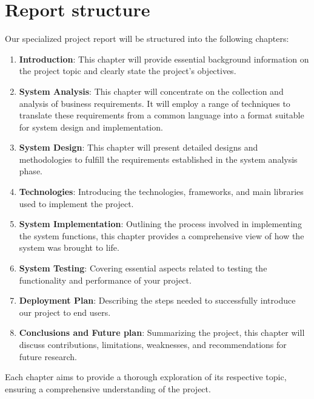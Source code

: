 \section{Report structure}
Our specialized project report will be structured into the following chapters:
\begin{enumerate}
    \item \textbf{Introduction}: This chapter will provide essential background information on the project topic and clearly state the project’s objectives.
    \item \textbf{System Analysis}:  This chapter will concentrate on the collection and analysis of business requirements. It will employ a range of techniques to translate these requirements from a common language into a format suitable for system design and implementation.
    \item \textbf{System Design}: This chapter will present detailed designs and methodologies to fulfill the requirements established in the system analysis phase.
    \item \textbf{Technologies}: Introducing the technologies, frameworks, and main libraries used to implement the project.
    \item \textbf{System Implementation}: Outlining the process involved in implementing the system functions, this chapter provides a comprehensive view of how the system was brought to life.
    \item \textbf{System Testing}:  Covering essential aspects related to testing the functionality and performance of your project.
    \item \textbf{Deployment Plan}: Describing the steps needed to successfully introduce our project to end users.
    \item \textbf{Conclusions and Future plan}:  Summarizing the project, this chapter will discuss contributions, limitations, weaknesses, and recommendations for future research.
\end{enumerate}


Each chapter aims to provide a thorough exploration of its respective topic, ensuring a comprehensive understanding of the project.